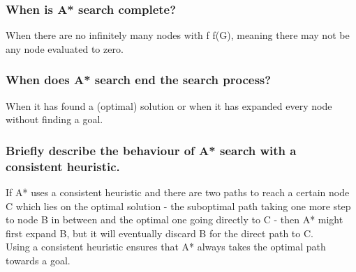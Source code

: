 \documentclass[paper=a4, fontsize=11pt]{scrartcl} %
\numberwithin{equation}{section} %
\numberwithin{figure}{section} %
\numberwithin{table}{section} %
\begin{document}
\subsubsection{When is A* search complete?}
When there are no infinitely many nodes with f \leq f(G), meaning there may not be any node evaluated to zero.

\subsubsection{When does A* search end the search process?}
When it has found a (optimal) solution or when it has expanded every node without finding a goal.

\subsubsection{Briefly describe the behaviour of A* search with a consistent heuristic.}
If A* uses a consistent heuristic and there are two paths to reach a certain node C which lies on the optimal solution - the suboptimal path taking one more step to node B in between and the optimal one going directly to C - then A* might first expand B, but it will eventually discard B for the direct path to C.\\
Using a consistent heuristic ensures that A* always takes the optimal path towards a goal.
\end{document}
